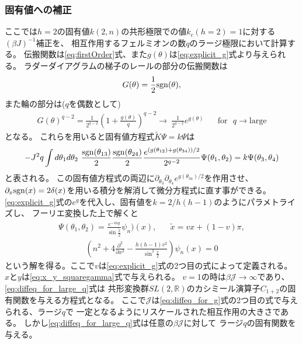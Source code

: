 \subsubsection{固有値への補正}
ここでは$h=2$の固有値$k(2, n)$の共形極限での値$k_c(h=2)=1$に対する$(\beta J)^{-1}$補正を、
相互作用するフェルミオンの数$q$のラージ極限において計算する。
伝搬関数は\eqref{eq:firstOrder}式、また$g(\theta)$は\eqref{eq:explicit_g}式より与えられる。
ラダーダイアグラムの梯子のレールの部分の伝搬関数は
\begin{align}
	G(\theta) = \frac{1}{2}\mathrm{sgn}(\theta),
\end{align}
また輪の部分は($q$を偶数として)
\begin{align}
	G(\theta)^{q-2}
	= \frac{1}{2^{q-2}}\left(1 + \frac{g(\theta)}{q}\right)^{q-2}
	\to\ \frac{1}{2^{q-2}}e^{g(\theta)}
	\hspace{20pt}\mathrm{for}\ \ \ q \to \mathrm{large}
\end{align}
となる。
これらを用いると固有値方程式$\tilde{K}\Psi = k\Psi$は
\begin{align}
	-J^2q\int d\theta_1 d\theta_2\ 
		\frac{\sgn(\theta_{13})}{2}\frac{\sgn(\theta_{24})}{2}
		\frac{e^{(g(\theta_{12}) + g(\theta_{34}))/2}}{2^{q-2}}
		\Psi(\theta_1, \theta_2)
	= k\Psi(\theta_3, \theta_4)
\end{align}
と表される。
この固有値方程式の両辺に$\partial_{\theta_3}\partial_{\theta_4}e^{g(\theta_{34})/2}$を作用させ、
$\partial_x\mathrm{sgn}(x) = 2\delta(x)$を用いる積分を解消して微分方程式に直す事ができる。
\eqref{eq:explicit_g}式の$e^g$を代入し、固有値を$k = 2/h(h-1)$のようにパラメトライズし、
フーリエ変換した上で解くと
\begin{align}
	\Psi(\theta_1, \theta_2) = \frac{e^{-iny}}{\sin\frac{\tilde{x}}{2}}\psi_n)(x),
	\hspace{20pt}\tilde{x} = vx + (1-v)\pi,
	\label{eq:eigenfunc_of_tilde_K}
\end{align}
\begin{align}
	\left(
		n^2 + 4\frac{\partial^2}{\partial x^2} - 
		\frac{h(h-1)v^2}{\sin^2\frac{\tilde{x}}{2}}
	\right)\psi_n(x) = 0
	\label{eq:diffeq_for_large_q}
\end{align}
という解を得る。ここで$v$は\eqref{eq:explicit_g}式の2つ目の式によって定義される。
$x$と$y$は\eqref{eq:x_y_squaregamma}式で与えられる。
$v=1$の時は$\beta \mathcal{J} \to \infty$であり、\eqref{eq:diffeq_for_large_q}式は
共形変換群$SL(2,\mathbb{R})$のカシミール演算子$C_{1+2}$の固有関数を与える方程式となる。
ここで$\mathcal{J}$は\eqref{eq:diffeq_for_g}式の2つ目の式で与えられる、ラージ$q$で
一定となるようにリスケールされた相互作用の大きさである。
しかし\eqref{eq:diffeq_for_large_q}式は任意の$\beta \mathcal{J}$に対して
ラージ$q$の固有関数を与える。

